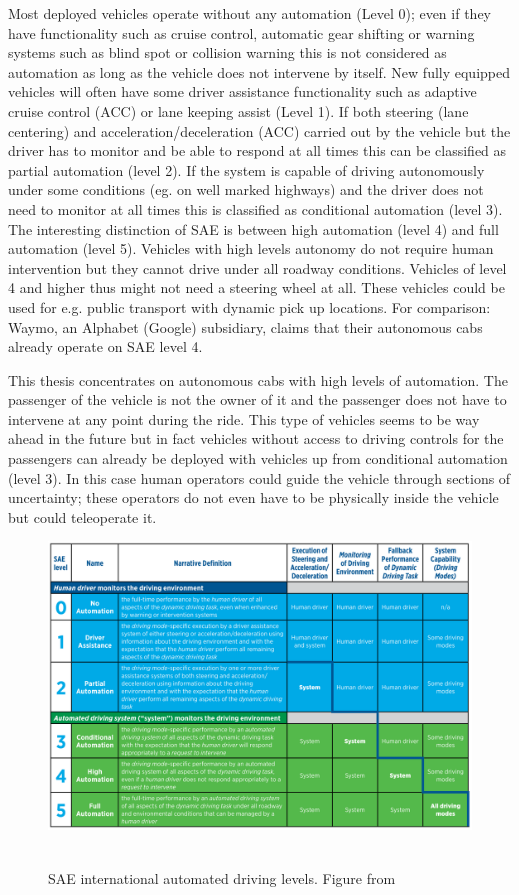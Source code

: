 Most deployed vehicles operate without any automation (Level 0); even if they have functionality such as cruise control, automatic gear shifting or warning systems such as blind spot or collision warning this is not considered as automation as long as the vehicle does not intervene by itself. 
New fully equipped vehicles will often have some driver assistance functionality such as adaptive cruise control (ACC) or lane keeping assist (Level 1). If both steering (lane centering) and acceleration/deceleration (ACC) carried out by the vehicle but the driver has to monitor and be able to respond at all times this can be classified as partial automation (level 2). If the system is capable of driving autonomously under some conditions (eg. on well marked highways) and the driver does not need to monitor at all times this is classified as conditional automation (level 3). The interesting distinction of SAE is between high automation (level 4) and full automation (level 5). Vehicles with high levels autonomy do not require human intervention but they cannot drive under all roadway conditions. Vehicles of level 4 and higher thus might not need a steering wheel at all. These vehicles could be used for e.g. public transport with dynamic pick up locations. For comparison: Waymo, an Alphabet (Google) subsidiary, claims that their autonomous cabs already operate on SAE level 4\cite{Waymo2018DriverlessApplication}. 

This thesis concentrates on autonomous cabs with high levels of automation. The passenger of the vehicle is not the owner of it and the passenger does not have to intervene at any point during the ride. This type of vehicles seems to be way ahead in the future but in fact vehicles without access to driving controls for the passengers can already be deployed with vehicles up from conditional automation (level 3). In this case human operators could guide the vehicle through sections of uncertainty; these operators do not even have to be physically inside the vehicle but could teleoperate it\cite{Hollander2016TheSystems}.  

\begin{figure}
    \includegraphics[width=1\textwidth]{fig/SAE}\hfill\
    \caption[SAE international automated driving levels]{SAE international automated driving levels. Figure from \cite{SAEinternational2016}}
    \label{fig:SAE}
\end{figure}

